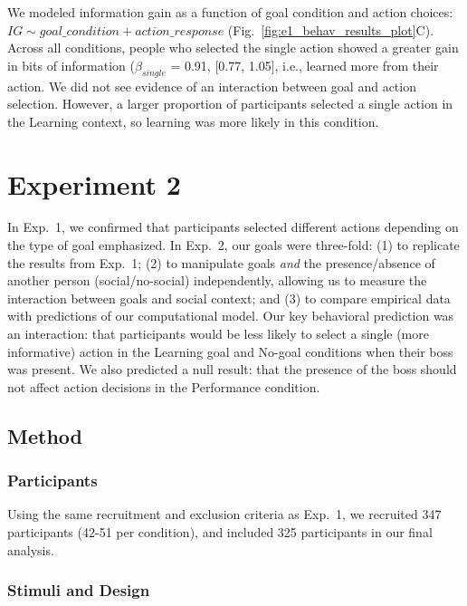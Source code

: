 \documentclass[10pt, letterpaper]{article}
\begin{document}
We modeled information gain as a function of goal condition and action
choices: \texttt{$IG \sim goal\_condition + action\_response$}
(Fig.~\ref{fig:e1_behav_results_plot}C). Across all conditions, people
who selected the single action showed a greater gain in bits of
information (\(\beta_{single}\) = 0.91, {[}0.77, 1.05{]}, i.e., learned
more from their action. We did not see evidence of an interaction
between goal and action selection. However, a larger proportion of
participants selected a single action in the Learning context, so
learning was more likely in this condition.

\section{Experiment 2}\label{experiment-2}

In Exp.~1, we confirmed that participants selected different actions
depending on the type of goal emphasized. In Exp.~2, our goals were
three-fold: (1) to replicate the results from Exp.~1; (2) to manipulate
goals \emph{and} the presence/absence of another person
(social/no-social) independently, allowing us to measure the interaction
between goals and social context; and (3) to compare empirical data with
predictions of our computational model. Our key behavioral prediction
was an interaction: that participants would be less likely to select a
single (more informative) action in the Learning goal and No-goal
conditions when their boss was present. We also predicted a null result:
that the presence of the boss should not affect action decisions in the
Performance condition.

\subsection{Method}\label{method-1}

\subsubsection{Participants}\label{participants-1}

Using the same recruitment and exclusion criteria as Exp.~1, we
recruited 347 participants (42-51 per condition), and included 325
participants in our final analysis.

\subsubsection{Stimuli and Design}\label{stimuli-and-design-1}
\end{document}
